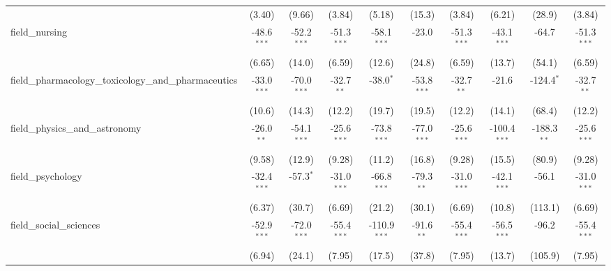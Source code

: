 \begin{tabular}{lccccccccc}
                                                               & (3.40)        & (9.66)         & (3.84)        & (5.18)         & (15.3)         & (3.84)        & (6.21)         & (28.9)         & (3.84)\\   
   field\_nursing                                              & -48.6$^{***}$ & -52.2$^{***}$  & -51.3$^{***}$ & -58.1$^{***}$  & -23.0          & -51.3$^{***}$ & -43.1$^{***}$  & -64.7          & -51.3$^{***}$\\   
                                                               & (6.65)        & (14.0)         & (6.59)        & (12.6)         & (24.8)         & (6.59)        & (13.7)         & (54.1)         & (6.59)\\   
   field\_pharmacology\_toxicology\_and\_pharmaceutics         & -33.0$^{***}$ & -70.0$^{***}$  & -32.7$^{**}$  & -38.0$^{*}$    & -53.8$^{***}$  & -32.7$^{**}$  & -21.6          & -124.4$^{*}$   & -32.7$^{**}$\\   
                                                               & (10.6)        & (14.3)         & (12.2)        & (19.7)         & (19.5)         & (12.2)        & (14.1)         & (68.4)         & (12.2)\\   
   field\_physics\_and\_astronomy                              & -26.0$^{**}$  & -54.1$^{***}$  & -25.6$^{***}$ & -73.8$^{***}$  & -77.0$^{***}$  & -25.6$^{***}$ & -100.4$^{***}$ & -188.3$^{**}$  & -25.6$^{***}$\\   
                                                               & (9.58)        & (12.9)         & (9.28)        & (11.2)         & (16.8)         & (9.28)        & (15.5)         & (80.9)         & (9.28)\\   
   field\_psychology                                           & -32.4$^{***}$ & -57.3$^{*}$    & -31.0$^{***}$ & -66.8$^{***}$  & -79.3$^{**}$   & -31.0$^{***}$ & -42.1$^{***}$  & -56.1          & -31.0$^{***}$\\   
                                                               & (6.37)        & (30.7)         & (6.69)        & (21.2)         & (30.1)         & (6.69)        & (10.8)         & (113.1)        & (6.69)\\   
   field\_social\_sciences                                     & -52.9$^{***}$ & -72.0$^{***}$  & -55.4$^{***}$ & -110.9$^{***}$ & -91.6$^{**}$   & -55.4$^{***}$ & -56.5$^{***}$  & -96.2          & -55.4$^{***}$\\   
                                                               & (6.94)        & (24.1)         & (7.95)        & (17.5)         & (37.8)         & (7.95)        & (13.7)         & (105.9)        & (7.95)\\   

\end{tabular}
